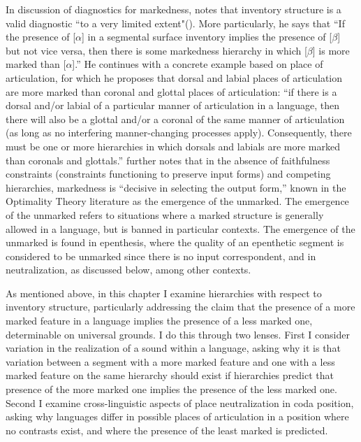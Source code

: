 \documentclass[output=paper]{langsci/langscibook}
\begin{document}
In discussion of diagnostics for markedness, \citeauthor{DeLacy2006} notes that inventory structure is a valid diagnostic ``to a very limited extent"(\citeyear[343]{DeLacy2006}). More particularly, he says that “If the presence of [$\alpha $] in a segmental surface inventory implies the presence of [$\beta $] but not vice versa, then there is some markedness hierarchy in which [$\beta $] is more marked than [$\alpha $].” He continues with a concrete example based on place of articulation,  for which he proposes that dorsal and labial places of articulation are more marked than coronal and glottal places of articulation: “if there is a dorsal and/or labial of a particular  manner of articulation in a language, then there will also be a glottal and/or a coronal of the same manner of articulation (as long as no interfering manner-changing processes apply). Consequently, there must be one or more hierarchies in which dorsals and labials are more marked than coronals and glottals.” \citet[110]{DeLacy2006} further notes that in the absence of faithfulness constraints (constraints functioning to preserve input forms) and competing hierarchies, markedness is “decisive in selecting the output form,” known in the Optimality Theory literature as the emergence of the unmarked. The emergence of the unmarked refers to situations where a marked structure is generally allowed in a language, but is banned in particular contexts. The emergence of the unmarked is found in epenthesis, where the quality of an epenthetic segment is considered to be unmarked since there is no input correspondent, and in neutralization, as discussed below, among other contexts.

As mentioned above, in this chapter I examine hierarchies with respect to inventory structure, particularly addressing the claim that the presence of a more marked feature in a language implies the presence of a less marked one, determinable on universal grounds. I do this through two lenses.  First I consider variation in the realization of a sound within a language, asking why it is that variation between a segment with a more marked  feature and one with a less marked feature on the same hierarchy should exist if hierarchies predict that presence of the more marked one implies the presence of the less marked one. Second I examine cross-linguistic aspects of place neutralization in coda position, asking why languages differ in possible places of articulation in a position where no contrasts exist, and where the presence of the least marked is predicted. 
\end{document}
